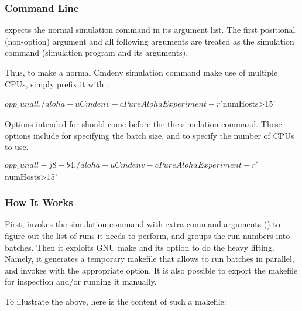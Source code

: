 \subsubsection{Command Line}
\label{sec:run-sim:opp-runall:comandline}

 expects the normal simulation command in its argument list.
The first positional (non-option) argument and all following arguments are
treated as the simulation command (simulation program and its arguments).

Thus, to make a normal Cmdenv simulation command make use of multiple CPUs,
simply prefix it with :    

\begin{commandline}
$ opp_runall ./aloha -u Cmdenv -c PureAlohaExperiment -r '$numHosts>15'
\end{commandline}

Options intended for  should come before the the simulation
command. These options include  for specifying the batch size, and 
 to specify the number of CPUs to use.

\begin{commandline}
$ opp_runall -j8 -b4 ./aloha -u Cmdenv -c PureAlohaExperiment -r '$numHosts>15'
\end{commandline}


\subsubsection{How It Works}
\label{sec:run-sim:opp-runall:operation}

First,  invokes the simulation command with extra command
arguments () to figure out the list of runs it needs to
perform, and groups the run numbers into batches. Then it exploits GNU make and
its  option to do the heavy lifting. Namely, it generates a
temporary makefile that allows  to run batches in parallel, and
invokes  with the appropriate  option. It is also possible
to export the makefile for inspection and/or running it manually.

To illustrate the above, here is the content of such a makefile:



